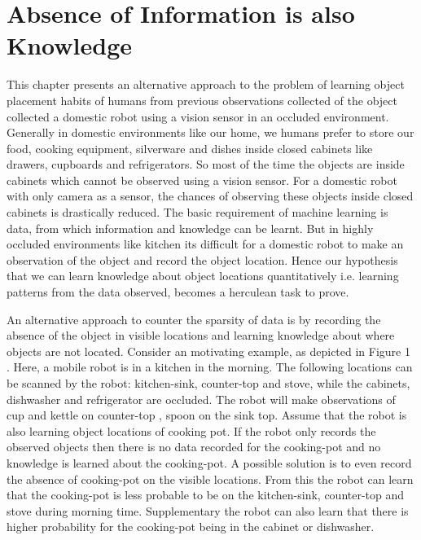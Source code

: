 

\chapter{Absence of Information is also Knowledge}

This chapter presents an alternative approach to the problem of learning object placement habits of humans from previous observations collected of the object collected a domestic robot using a vision sensor in an occluded environment.
Generally in domestic environments like our home, we humans prefer to store our food, cooking equipment, silverware and dishes inside closed cabinets like drawers, cupboards and refrigerators. So most of the time the objects are inside cabinets which cannot be observed using a vision sensor. For a domestic robot with only camera as a sensor, the chances of observing  these objects inside closed cabinets is drastically reduced.
The basic requirement of machine learning is data, from which information and knowledge can be learnt. But in highly occluded environments like kitchen its difficult for a domestic robot to make an observation of the object and record the object location.  Hence our hypothesis that we can learn knowledge about object locations quantitatively i.e. learning patterns from the data observed, becomes a herculean task to prove.

An alternative approach to counter the sparsity of data is by recording the absence of the object in visible locations and learning knowledge about where objects are not located. Consider an motivating example, as depicted in Figure 1  . Here, a mobile robot is in a kitchen in the morning. The following locations can be scanned by the robot: kitchen-sink, counter-top and stove, while the cabinets, dishwasher and refrigerator are occluded. The robot will make observations of cup and kettle on counter-top , spoon on the sink top. Assume that the robot is also learning object locations of cooking pot. If the robot only records the observed objects then there is no data recorded for the cooking-pot and no knowledge is learned about the cooking-pot. A possible solution is to even record the absence of cooking-pot on the visible locations. From this the robot can learn that the cooking-pot is less probable to be on the kitchen-sink, counter-top and stove during morning time. Supplementary the robot can also learn that there is higher probability for the cooking-pot being in the cabinet or dishwasher.

